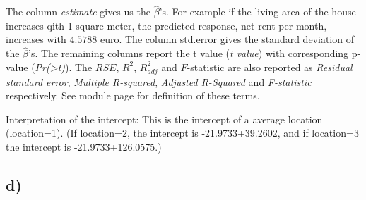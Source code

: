 \documentclass[]{article}
\newenvironment{Shaded}{\begin{snugshade}}{\end{snugshade}}
\newcommand{\KeywordTok}[1]{\textcolor[rgb]{0.13,0.29,0.53}{\textbf{#1}}}
\newcommand{\DataTypeTok}[1]{\textcolor[rgb]{0.13,0.29,0.53}{#1}}
\newcommand{\DecValTok}[1]{\textcolor[rgb]{0.00,0.00,0.81}{#1}}
\newcommand{\CommentTok}[1]{\textcolor[rgb]{0.56,0.35,0.01}{\textit{#1}}}
\newcommand{\OperatorTok}[1]{\textcolor[rgb]{0.81,0.36,0.00}{\textbf{#1}}}
\newcommand{\NormalTok}[1]{#1}
\begin{document}
The column \emph{estimate} gives us the \(\hat{\beta}\)'s. For example
if the living area of the house increases qith 1 square meter, the
predicted response, net rent per month, increases with \(4.5788\) euro.
The column std.error gives the standard deviation of the
\(\hat{\beta}\)'s. The remaining columns report the t value (\emph{t
value}) with corresponding p-value
(\emph{Pr(\textgreater{}\textbar{}t\textbar{})}). The \(RSE\), \(R^2\),
\(R_{adj}^2\) and \(F\)-statistic are also reported as \emph{Residual
standard error}, \emph{Multiple R-squared}, \emph{Adjusted R-Squared}
and \emph{F-statistic} respectively. See module page for definition of
these terms.

Interpretation of the intercept: This is the intercept of a average
location (location=1). (If location=2, the intercept is
-21.9733+39.2602, and if location=3 the intercept is -21.9733+126.0575.)

\subsection{d)}\label{d-1}

\begin{Shaded}
\end{Shaded}
\end{document}
